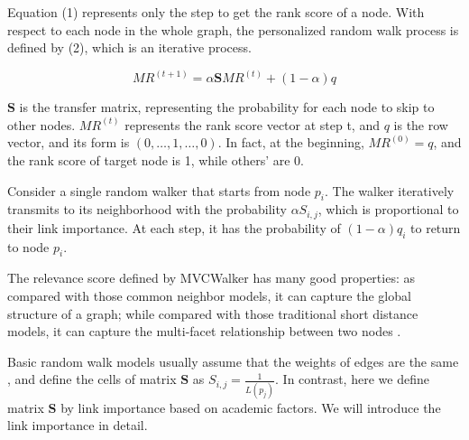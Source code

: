 \documentclass[10pt,journal,compsoc]{IEEEtran}
\begin{document}
Equation (1) represents only the step to get the rank score of a node. With respect to each node in the whole graph, the personalized random walk process is defined by (2), which is an iterative process.

\begin{equation}
MR^{(t+1)}=\alpha \mathbf{S}MR^{(t)}+(1-\alpha)q
\end{equation}

$\mathbf{S}$ is the transfer matrix, representing the probability for each node to skip to other nodes. $MR^{(t)}$ represents the rank score vector at step t, and $q$ is the row vector, and its form is $(0, \ldots, 1, \ldots, 0)$. In fact, at the beginning, $MR^{(0)}=q$, and the rank score of target node is 1, while others' are 0.

Consider a single random walker that starts from node $p_{i}$. The walker iteratively transmits to its neighborhood with the probability $\alpha S_{i,j}$, which is proportional to their link importance. At each step, it has the probability of $(1-\alpha)q_{i}$ to return to node $p_{i}$.

The relevance score defined by MVCWalker has many good properties: as compared with those common neighbor models, it can capture the global structure of a graph; while compared with those traditional short distance models, it can capture the multi-facet relationship between two nodes \cite{Tong:center}.

Basic random walk models usually assume that the weights of edges are the same \cite{tong2006fast}, and define the cells of matrix $\mathbf{S}$ as $S_{i,j}=\frac{1}{L(p_{j})}$. In contrast, here we define matrix $\mathbf{S}$ by link importance based on academic factors. We will introduce the link importance in detail.
\end{document}
